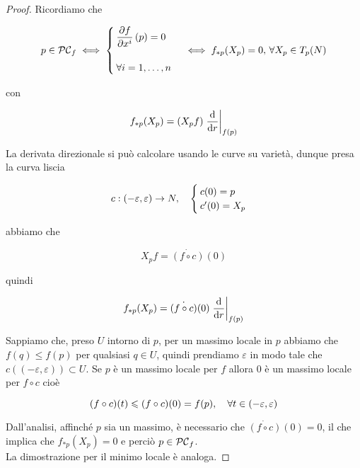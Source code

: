 \begin{proof}
	Ricordiamo che
	
	\begin{equation}
		p \in \PC_{f} %
		\iff %
		\begin{cases}
			\dpdv{f}{x^{i}} \, (p) = 0 \\ \\
			\forall i=1,\dots,n
		\end{cases} %
		\iff %
		f_{*p}(X_{p}) = 0, \, \forall X_{p} \in T_{p}(N)
	\end{equation}

	con
	
	\begin{equation}
		f_{*p}(X_{p}) = (X_{p} f) \eval{ \dv{r} }_{f(p)}
	\end{equation}
	
	La derivata direzionale si può calcolare usando le curve su varietà, dunque presa la curva liscia
				
	\begin{equation}
		c : (-\varepsilon,\varepsilon) \to N \qcomma %
		\begin{cases}
			c(0) = p \\
			c'(0) = X_{p}
		\end{cases}
	\end{equation}

	abbiamo che
	
	\begin{equation}
		X_{p} f = \dot{(f \circ c)}(0)
	\end{equation}
	
	quindi
	
	\begin{equation}
		f_{*p}(X_{p}) = \dot{(f \circ c)}(0) \eval{ \dv{r} }_{f(p)}
	\end{equation}
	
	Sappiamo che, preso $ U $ intorno di $ p $, per un massimo locale in $ p $ abbiamo che $ f(q) \leqslant f(p) $ per qualsiasi $ q \in U $, quindi prendiamo $ \varepsilon $ in modo tale che $ c((-\varepsilon,\varepsilon)) \subset U $. Se $ p $ è un massimo locale per $ f $ allora 0 è un massimo locale per $ f \circ c $ cioè
	
	\begin{equation}
		(f \circ c)(t) \leqslant (f \circ c)(0) = f(p) \qcomma \forall t \in (-\varepsilon,\varepsilon)
	\end{equation}

	Dall'analisi, affinché $ p $ sia un massimo, è necessario che $ \dot{(f \circ c)}(0) = 0 $, il che implica che $ f_{*p}(X_{p}) = 0 $ e perciò $ p \in \mathcal{PC}_{f} $. \\	
	La dimostrazione per il minimo locale è analoga.
\end{proof}

